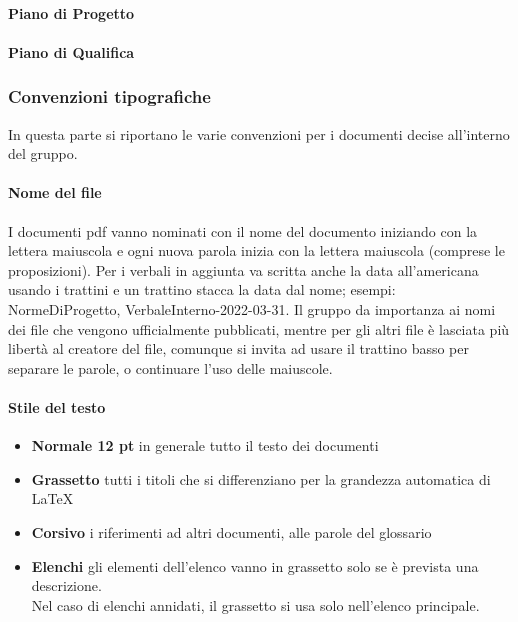 \paragraph{Piano di Progetto}

\paragraph{Piano di Qualifica}


\subsubsection{Convenzioni tipografiche}
In questa parte si riportano le varie convenzioni per i documenti decise all'interno del gruppo.
\paragraph{Nome del file}
I documenti pdf vanno nominati con il nome del documento iniziando con la lettera maiuscola 
e ogni nuova parola inizia con la lettera maiuscola (comprese le proposizioni). Per i verbali in 
aggiunta va scritta anche la data all'americana usando i trattini e un trattino stacca la data 
dal nome; esempi: NormeDiProgetto, VerbaleInterno-2022-03-31. \newline
Il gruppo da importanza ai nomi dei file che vengono ufficialmente pubblicati, mentre per gli altri 
file è lasciata più libertà al creatore del file, comunque si invita ad usare il trattino basso per 
separare le parole, o continuare l'uso delle maiuscole.

\paragraph{Stile del testo}
\begin{itemize}
        \item \textbf{Normale 12 pt} in generale tutto il testo dei documenti
        \item \textbf{Grassetto} tutti i titoli che si differenziano per la grandezza automatica di \LaTeX
        \item \textbf{Corsivo} i riferimenti ad altri documenti, alle parole del glossario
        \item \textbf{Elenchi} gli elementi dell'elenco vanno in grassetto solo se è prevista una descrizione. \\
                                Nel caso di elenchi annidati, il grassetto si usa solo nell'elenco principale.
\end{itemize}

